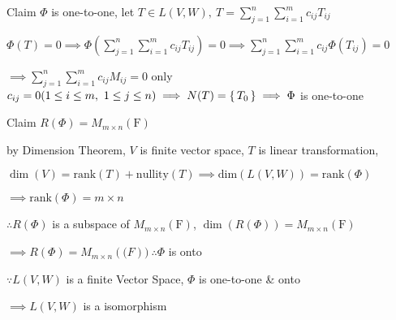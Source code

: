\begin{tcolorbox}
	Claim $\Phi$ is one-to-one, let $T \in L(V,W),~T =\sum^n_{j=1}\sum^m_{i=1}c_{ij}T_{ij}$
	
	$\Phi(T) = 0 \implies \Phi(\sum^n_{j=1}\sum^m_{i=1}c_{ij}T_{ij}) = 0 \implies \sum^n_{j=1}\sum^m_{i=1}c_{ij}\Phi(T_{ij}) = 0 $
	
	$\implies \sum^n_{j=1}\sum^m_{i=1}c_{ij}M_{ij} = 0$ only $c_{ij} = 0 (1 \leq i \leq m,~ 1 \leq j \leq n) \implies N(T) = \left\{ \,T_0 \,\right\} \implies \Phi$ is one-to-one
	
	Claim $R(\Phi) = M_{m \times n}(\mathrm{F})$
	
	by Dimension Theorem, $V$ is finite vector space, $T$ is linear transformation,
	
	$\dim(V) = \text{rank}(T) + \text{nullity}(T) \implies \text{dim}(L(V,W)) = \text{rank}(\Phi) $
	
	$\implies \text{rank}(\Phi) = m \times n$
	
	$\therefore R(\Phi)$ is a subspace of $M_{m \times n}(\mathrm{F})$, $\dim(R(\Phi)) =  M_{m \times n}(\mathrm{F}) $
	
	$\implies R(\Phi) = M_{m \times n}(\mathrm(F)) ~\therefore \Phi$ is onto
	
	$\because L(V,W)$ is a finite Vector Space, $\Phi$ is one-to-one \& onto 
	
	$\implies L(V,W)$ is a isomorphism
\end{tcolorbox}